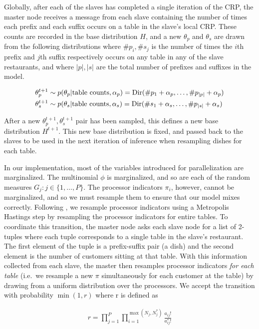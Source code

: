 Globally, after each of the slaves has completed a single iteration of
the CRP, the master node receives a message from each slave containing
the number of times each prefix and each suffix occurs on a table in
the slave's local CRP. These counts are recorded in the base
distribution $H$, and a new $\theta_p$ and $\theta_s$ are drawn from
the following distributions where $\#p_i, \#s_j$ is the number of
times the $i$th prefix and $j$th suffix respectively occurs on any
table in any of the slave restaurants, and where $|p|, |s|$ are the
total number of prefixes and suffixes in the model.

\begin{align}
  \theta_p^{t+1} & \sim p(\theta_p | \text{table counts}, \alpha_p)
  = \mathrm{Dir}(\#p_1 + \alpha_p, \ldots, \#p_{|p|} + \alpha_p) \\
  \theta_s^{t+1} & \sim p(\theta_s | \text{table counts}, \alpha_s)
  = \mathrm{Dir}(\#s_1 + \alpha_s, \ldots, \#p_{|s|} + \alpha_s)
\end{align}

After a new $\theta_p^{t+1}, \theta_s^{t+1}$ pair has been sampled,
this defines a new base distribution $H^{t+1}$. This new base
distribution is fixed, and passed back to the slaves to be used in the
next iteration of inference when resampling dishes for each table.

In our implementation, most of the variables introduced for
parallelization are marginalized. The multinomial $\phi$ is
marginalized, and so are each of the random measures $G_j : j \in \{1,
\ldots, P\}$. The processor indicators $\pi_i$, however, cannot be
marginalized, and so we must resample them to ensure that our model
mixes correctly. Following \cite{williamson2013}, we resample
processor indicators using a Metropolis Hastings step by resampling
the processor indicators for entire tables. To coordinate this
transition, the master node asks each slave node for a list of
2-tuples where each tuple corresponds to a single table in the slave's
restaurant. The first element of the tuple is a prefix-suffix pair (a
dish) and the second element is the number of customers sitting at
that table. With this information collected from each slave, the
master then resamples processor indicators \textit{for each table}
(i.e.~we resample a new $\pi$ simultaneously for each customer at the
table) by drawing from a uniform distribution over the processors. We
accept the transition with probability $\min(1, r)$ where r is defined
as

\begin{align}
  r = \prod_{j = 1}^P \prod_{i=1}^{\max(N_j, N_j^*)} \frac{a_{ij}!}{a_{ij}^*!}
\end{align}


